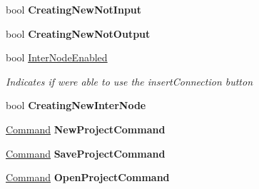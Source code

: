 \begin{DoxyCompactItemize}
\item 
\hypertarget{class_prototipo_t_f_g_1_1_main_view_model_a63e9f92c20b265d59e80011b45a95e97}{}bool {\bfseries Creating\+New\+Not\+Input}\label{class_prototipo_t_f_g_1_1_main_view_model_a63e9f92c20b265d59e80011b45a95e97}

\item 
\hypertarget{class_prototipo_t_f_g_1_1_main_view_model_ae0e9a911e0322b38f2ec015f5199a963}{}bool {\bfseries Creating\+New\+Not\+Output}\label{class_prototipo_t_f_g_1_1_main_view_model_ae0e9a911e0322b38f2ec015f5199a963}

\item 
bool \hyperlink{class_prototipo_t_f_g_1_1_main_view_model_a2517a0d1f92fd6dd07e360fd4e3b1d51}{Inter\+Node\+Enabled}
\begin{DoxyCompactList}\small\item\em Indicates if we\textquotesingle{}re able to use the insert\+Connection button \end{DoxyCompactList}\item 
\hypertarget{class_prototipo_t_f_g_1_1_main_view_model_a4286ebe5e73278b76884c8af48d39771}{}bool {\bfseries Creating\+New\+Inter\+Node}\label{class_prototipo_t_f_g_1_1_main_view_model_a4286ebe5e73278b76884c8af48d39771}

\item 
\hypertarget{class_prototipo_t_f_g_1_1_main_view_model_a8c3722d3c115d977a3f70da589ad1fa2}{}\hyperlink{class_prototipo_t_f_g_1_1_command}{Command} {\bfseries New\+Project\+Command}\label{class_prototipo_t_f_g_1_1_main_view_model_a8c3722d3c115d977a3f70da589ad1fa2}

\item 
\hypertarget{class_prototipo_t_f_g_1_1_main_view_model_abbe6a2c838db7514a8c3b1408773801b}{}\hyperlink{class_prototipo_t_f_g_1_1_command}{Command} {\bfseries Save\+Project\+Command}\label{class_prototipo_t_f_g_1_1_main_view_model_abbe6a2c838db7514a8c3b1408773801b}

\item 
\hypertarget{class_prototipo_t_f_g_1_1_main_view_model_a854179955989bb0f494065129f6d13e9}{}\hyperlink{class_prototipo_t_f_g_1_1_command}{Command} {\bfseries Open\+Project\+Command}\label{class_prototipo_t_f_g_1_1_main_view_model_a854179955989bb0f494065129f6d13e9}


\end{DoxyCompactItemize}
